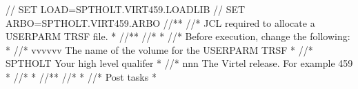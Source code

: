 \documentclass[letterpaper,10pt,english]{sphinxmanual}
\begin{document}
\begin{sphinxVerbatim}[commandchars=\\\{\}]
//        SET  LOAD=SPTHOLT.VIRT459.LOADLIB
//        SET  ARBO=SPTHOLT.VIRT459.ARBO
//*\PYGZhy{}\PYGZhy{}\PYGZhy{}\PYGZhy{}\PYGZhy{}\PYGZhy{}\PYGZhy{}\PYGZhy{}\PYGZhy{}\PYGZhy{}\PYGZhy{}\PYGZhy{}\PYGZhy{}\PYGZhy{}\PYGZhy{}\PYGZhy{}\PYGZhy{}\PYGZhy{}\PYGZhy{}\PYGZhy{}\PYGZhy{}\PYGZhy{}\PYGZhy{}\PYGZhy{}\PYGZhy{}\PYGZhy{}\PYGZhy{}\PYGZhy{}\PYGZhy{}\PYGZhy{}\PYGZhy{}\PYGZhy{}\PYGZhy{}\PYGZhy{}\PYGZhy{}\PYGZhy{}\PYGZhy{}\PYGZhy{}\PYGZhy{}\PYGZhy{}\PYGZhy{}\PYGZhy{}\PYGZhy{}\PYGZhy{}\PYGZhy{}\PYGZhy{}\PYGZhy{}\PYGZhy{}\PYGZhy{}\PYGZhy{}\PYGZhy{}\PYGZhy{}\PYGZhy{}\PYGZhy{}\PYGZhy{}\PYGZhy{}\PYGZhy{}\PYGZhy{}\PYGZhy{}\PYGZhy{}\PYGZhy{}\PYGZhy{}\PYGZhy{}\PYGZhy{}*
//* JCL required to allocate a USERPARM TRSF file.                 *
//*\PYGZhy{}\PYGZhy{}\PYGZhy{}\PYGZhy{}\PYGZhy{}\PYGZhy{}\PYGZhy{}\PYGZhy{}\PYGZhy{}\PYGZhy{}\PYGZhy{}\PYGZhy{}\PYGZhy{}\PYGZhy{}\PYGZhy{}\PYGZhy{}\PYGZhy{}\PYGZhy{}\PYGZhy{}\PYGZhy{}\PYGZhy{}\PYGZhy{}\PYGZhy{}\PYGZhy{}\PYGZhy{}\PYGZhy{}\PYGZhy{}\PYGZhy{}\PYGZhy{}\PYGZhy{}\PYGZhy{}\PYGZhy{}\PYGZhy{}\PYGZhy{}\PYGZhy{}\PYGZhy{}\PYGZhy{}\PYGZhy{}\PYGZhy{}\PYGZhy{}\PYGZhy{}\PYGZhy{}\PYGZhy{}\PYGZhy{}\PYGZhy{}\PYGZhy{}\PYGZhy{}\PYGZhy{}\PYGZhy{}\PYGZhy{}\PYGZhy{}\PYGZhy{}\PYGZhy{}\PYGZhy{}\PYGZhy{}\PYGZhy{}\PYGZhy{}\PYGZhy{}\PYGZhy{}\PYGZhy{}\PYGZhy{}\PYGZhy{}\PYGZhy{}\PYGZhy{}*
//*                                                                *
//* Before execution, change the following:\PYGZhy{}                       *
//*      \PYGZsq{}vvvvvv\PYGZsq{}   The name of the volume for the USERPARM TRSF   *
//*      \PYGZsq{}SPTHOLT\PYGZsq{}  Your high level qualifer                       *
//*      \PYGZsq{}nnn\PYGZsq{}    \PYGZsq{} The Virtel release. For example 459            *
//*                                                                *
//*\PYGZhy{}\PYGZhy{}\PYGZhy{}\PYGZhy{}\PYGZhy{}\PYGZhy{}\PYGZhy{}\PYGZhy{}\PYGZhy{}\PYGZhy{}\PYGZhy{}\PYGZhy{}\PYGZhy{}\PYGZhy{}\PYGZhy{}\PYGZhy{}\PYGZhy{}\PYGZhy{}\PYGZhy{}\PYGZhy{}\PYGZhy{}\PYGZhy{}\PYGZhy{}\PYGZhy{}\PYGZhy{}\PYGZhy{}\PYGZhy{}\PYGZhy{}\PYGZhy{}\PYGZhy{}\PYGZhy{}\PYGZhy{}\PYGZhy{}\PYGZhy{}\PYGZhy{}\PYGZhy{}\PYGZhy{}\PYGZhy{}\PYGZhy{}\PYGZhy{}\PYGZhy{}\PYGZhy{}\PYGZhy{}\PYGZhy{}\PYGZhy{}\PYGZhy{}\PYGZhy{}\PYGZhy{}\PYGZhy{}\PYGZhy{}\PYGZhy{}\PYGZhy{}\PYGZhy{}\PYGZhy{}\PYGZhy{}\PYGZhy{}\PYGZhy{}\PYGZhy{}\PYGZhy{}\PYGZhy{}\PYGZhy{}\PYGZhy{}\PYGZhy{}\PYGZhy{}*
//*                                                                *
//* Post tasks                                                     *

\end{sphinxVerbatim}
\end{document}
